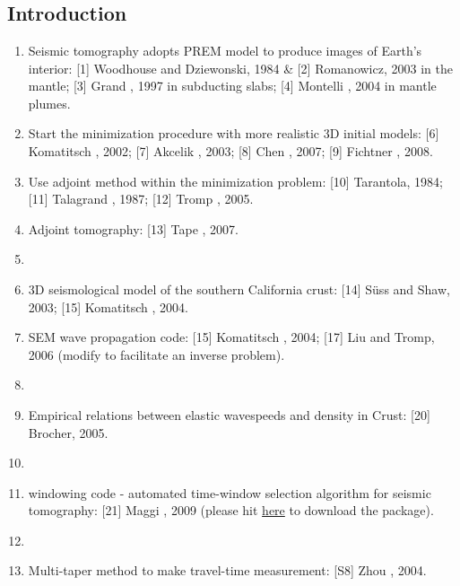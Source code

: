 \renewcommand{\pmk}{Tape\_2009\_S\_Adjoint at SCC}
\renewcommand{\prf}{FWI/\pmk.pdf}
\renewcommand{\pti}{Adjoint tomography of the southern California crust}
\renewcommand{\pay}{Carl Tape, Qinya Liu, and Alessia Maggi \etal, 2009}
\renewcommand{\pjo}{Science}
\renewcommand{\pda}{2016/11/27 Sun.}

\section{\pinfo}
\subsection{Introduction}
\begin{enumerate}[\hspace{10mm}*]
  \item Seismic tomography adopts PREM model to produce images of Earth's interior:
    [1] Woodhouse and Dziewonski, 1984 \& [2] Romanowicz, 2003 in the mantle;
    [3] Grand \etal, 1997 in subducting slabs; [4] Montelli \etal, 2004 in mantle plumes.
  \item Start the minimization procedure with more realistic 3D initial models:
    [6] Komatitsch \etal, 2002; [7] Akcelik \etal, 2003;
    [8] Chen \etal, 2007; [9] Fichtner \etal, 2008.
  \item Use adjoint method within the minimization problem:
    [10] Tarantola, 1984; [11] Talagrand \etal, 1987; [12] Tromp \etal, 2005.
  \item Adjoint tomography: [13] Tape \etal, 2007.
  \item \sline
  \item 3D seismological model of the southern California crust:
    [14] S\"{u}ss and Shaw, 2003; [15] Komatitsch \etal, 2004.
  \item SEM wave propagation code: [15] Komatitsch \etal, 2004;
    [17] Liu and Tromp, 2006 (modify to facilitate an inverse problem).
  \item \sline
  \item Empirical relations between elastic wavespeeds and density in Crust: [20] Brocher, 2005.
  \item \sline
  \item {} windowing code - automated time-window selection algorithm
    for seismic tomography: [21] Maggi \etal, 2009
    (please hit \href{http://geodynamics.org/cig/software/flexwin/}{here} to download the package).
  \item \sline
  \item Multi-taper method to make travel-time measurement: [S8] Zhou \etal, 2004.

\end{enumerate}
